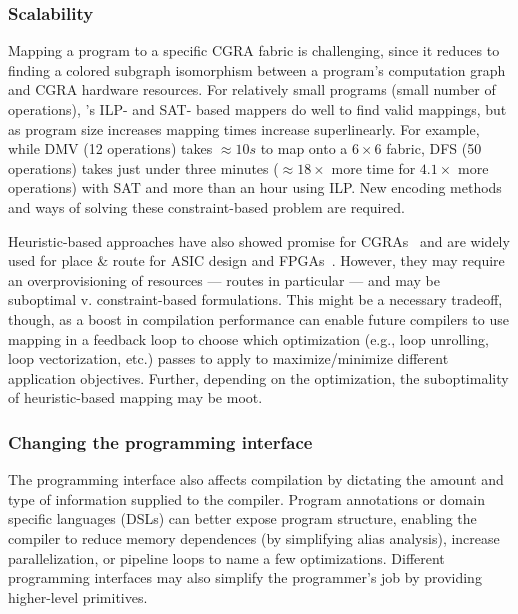 \subsubsection{Scalability}
Mapping a program to a specific CGRA fabric is challenging, since it reduces to finding a colored subgraph isomorphism between a program's computation graph and CGRA hardware resources.
% 
For relatively small programs (small number of operations), \riptide's ILP- and SAT- based mappers do well to find valid mappings, but as program size increases mapping times increase superlinearly.
% 
For example, while DMV (12 operations) takes $\approx10s$ to map onto a $6\times6$ fabric, DFS (50 operations) takes just under three minutes ($\approx 18\times$ more time for $4.1\times$ more operations) with SAT and more than an hour using ILP.
% 
New encoding methods and ways of solving these constraint-based problem are required.
% 
% 
% 

Heuristic-based approaches have also showed promise for CGRAs~\cite{himap,lee2021ultra,4dcgra,amp2020,chordmap,pathseeker} and are widely used for place \& route for ASIC design and FPGAs~\cite{chen2006fpga}.
% 
However, they may require an overprovisioning of resources --- routes in particular --- and may be suboptimal v. constraint-based formulations.
%
% 
This might be a necessary tradeoff, though, as a boost in compilation performance can enable future compilers to use mapping in a feedback loop to choose which optimization (e.g., loop unrolling, loop vectorization, etc.) passes to apply to maximize/minimize different application objectives.
% 
Further, depending on the optimization, the suboptimality of heuristic-based mapping may be moot.

\subsubsection{Changing the programming interface}
The programming interface also affects compilation by dictating the amount and type of information supplied to the compiler.
% 
Program annotations or domain specific languages (DSLs) can better expose program structure, enabling the compiler to reduce memory dependences (by simplifying alias analysis), increase parallelization, or pipeline loops to name a few optimizations. 
% 
Different programming interfaces may also simplify the programmer's job by providing higher-level primitives.

